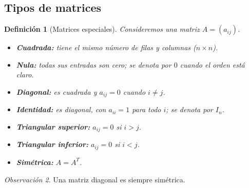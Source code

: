 \documentclass[12pt]{article}
\newtheorem{definicion}{Definición}[section]
\theoremstyle{remark}
\newtheorem{observacion}[definicion]{Observación}
\begin{document}
\subsection*{Tipos de matrices}
\begin{definicion}[Matrices especiales]
Consideremos una matriz $A=(a_{ij})$.
\begin{itemize}
\item \textbf{Cuadrada:} tiene el mismo número de filas y columnas ($n\times n$).
\item \textbf{Nula:} todas sus entradas son cero; se denota por $0$ cuando el orden está claro.
\item \textbf{Diagonal:} es cuadrada y $a_{ij}=0$ cuando $i\ne j$.
\item \textbf{Identidad:} es diagonal, con $a_{ii}=1$ para todo $i$; se denota por $I_n$.
\item \textbf{Triangular superior:} $a_{ij}=0$ si $i>j$.
\item \textbf{Triangular inferior:} $a_{ij}=0$ si $i<j$.
\item \textbf{Simétrica:} $A=A^T$.
\end{itemize}
\end{definicion}

\begin{observacion}
Una matriz diagonal es siempre simétrica.
\end{observacion}

\end{document}
